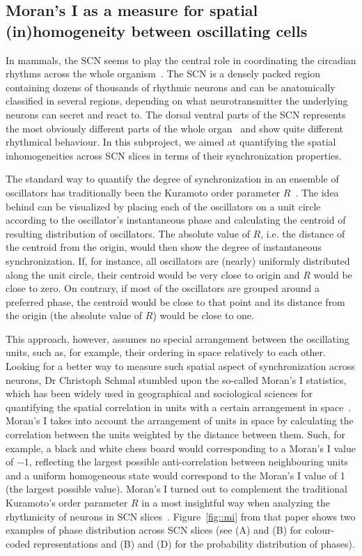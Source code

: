 \subsection{Moran's I as a measure for spatial (in)homogeneity between
oscillating cells}
In mammals, the SCN seems to play the central role in coordinating the
circadian rhythms across the whole
organism~\cite{reppert2002coordination}. The SCN is a densely packed
region containing dozens of thousands of rhythmic neurons and can be
anatomically classified in several regions, depending on what
neurotransmitter the underlying neurons can secret and react to. The
dorsal ventral parts of the SCN represents the most obviously
different parts of the whole organ~\cite{yamaguchi2003synchronization}
and show quite different rhythmical behaviour. In this subproject, we
aimed at quantifying the spatial inhomogeneities across SCN slices in
terms of their synchronization properties.

The standard way to quantify the degree of synchronization in an
ensemble of oscillators has traditionally been the Kuramoto order
parameter $R$~\cite{kuramoto2012chemical}. The idea behind can be
visualized by placing each of the oscillators on a unit circle
according to the oscillator's instantaneous phase and calculating the
centroid of resulting distribution of oscillators. The absolute value
of $R$, i.e. the distance of the centroid from the origin, would then
show the degree of instantaneous synchronization. If, for instance,
all oscillators are (nearly) uniformly distributed along the unit
circle, their centroid would be very close to origin and $R$
would be close to zero. On contrary, if most of the oscillators are
grouped around a preferred phase, the centroid would be close to that
point and its distance from the origin (the absolute value of $R$)
would be close to one.

This approach, however, assumes no special arrangement between
the oscillating units, such as, for example, their ordering in space
relatively to each other. Looking for a better way to measure such
spatial aspect of synchronization across neurons, Dr Christoph Schmal
stumbled upon the so-called Moran's I statistics, which has been
widely used in geographical and sociological sciences for quantifying
the spatial correlation in units with a certain arrangement in
space~\cite{moran1950notes}. Moran's I takes into account the
arrangement of units in space by calculating the correlation between
the units weighted by the distance between them. Such, for example, a
black and white chess board would corresponding to a Moran's I value
of $-1$, reflecting the largest possible anti-correlation between
neighbouring units and a uniform homogeneous state would correspond to
the Moran's I value of 1 (the largest possible value). Moran's I
turned out to complement the traditional Kuramoto's order parameter
$R$ in a most insightful way when analyzing the rhythmicity of neurons
in SCN slices~\cite{schmal2017moran}. Figure~\ref{fig::mi} from that
paper shows two examples of phase distribution across SCN slices (see
(A) and (B) for colour-coded representations and (B) and (D) for the
probability distribution of phases).

